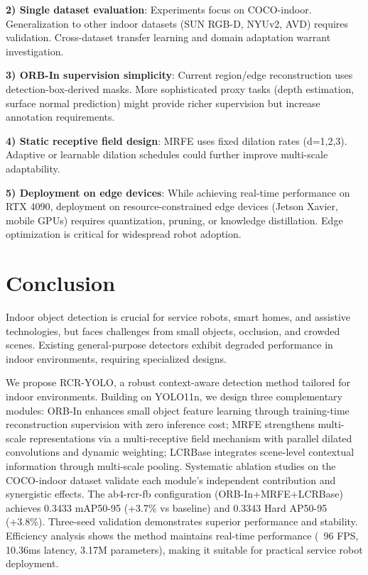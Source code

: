 \documentclass[journal]{IEEEtran}
\begin{document}
\textbf{2) Single dataset evaluation}: Experiments focus on COCO-indoor. Generalization to other indoor datasets (SUN RGB-D, NYUv2, AVD) requires validation. Cross-dataset transfer learning and domain adaptation warrant investigation.

\textbf{3) ORB-In supervision simplicity}: Current region/edge reconstruction uses detection-box-derived masks. More sophisticated proxy tasks (depth estimation, surface normal prediction) might provide richer supervision but increase annotation requirements.

\textbf{4) Static receptive field design}: MRFE uses fixed dilation rates (d=1,2,3). Adaptive or learnable dilation schedules could further improve multi-scale adaptability.

\textbf{5) Deployment on edge devices}: While achieving real-time performance on RTX 4090, deployment on resource-constrained edge devices (Jetson Xavier, mobile GPUs) requires quantization, pruning, or knowledge distillation. Edge optimization is critical for widespread robot adoption.

\section{Conclusion}
\label{sec:conclusion}

Indoor object detection is crucial for service robots, smart homes, and assistive technologies, but faces challenges from small objects, occlusion, and crowded scenes. Existing general-purpose detectors exhibit degraded performance in indoor environments, requiring specialized designs.

We propose RCR-YOLO, a robust context-aware detection method tailored for indoor environments. Building on YOLO11n, we design three complementary modules: ORB-In enhances small object feature learning through training-time reconstruction supervision with zero inference cost; MRFE strengthens multi-scale representations via a multi-receptive field mechanism with parallel dilated convolutions and dynamic weighting; LCRBase integrates scene-level contextual information through multi-scale pooling. Systematic ablation studies on the COCO-indoor dataset validate each module's independent contribution and synergistic effects. The ab4-rcr-fb configuration (ORB-In+MRFE+LCRBase) achieves 0.3433 mAP50-95 (+3.7\% vs baseline) and 0.3343 Hard AP50-95 (+3.8\%). Three-seed validation demonstrates superior performance and stability. Efficiency analysis shows the method maintains real-time performance (~96 FPS, 10.36ms latency, 3.17M parameters), making it suitable for practical service robot deployment.
\end{document}
